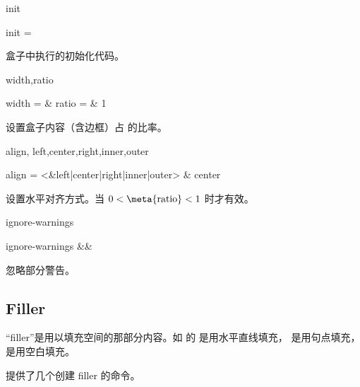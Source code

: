 \documentclass[twoside]{book}
\def\xampletext{\par}
\def\xampleprint{\xamplecode \xampleline \xampletext}
\begin{document}
\begin{keyval}[path=frame]{init}
  \begin{syntax}
    init = 
  \end{syntax}
盒子中执行的初始化代码。
\end{keyval}

\begin{keyval}[path=frame]{width,ratio}
  \begin{syntax}
    width =  & \V\textwidth
    ratio =  & 1
  \end{syntax}
 设置盒子内容（含边框）占  的比率。
\end{keyval}

\begin{keyval}[path=frame]{align,
  left,center,right,inner,outer}
  \begin{syntax}
    align = <&left|center|right|inner|outer> & center 
  \end{syntax}
设置水平对齐方式。当 $ 0 <{} \text{\meta{ratio}} {}< 1 $ 时才有效。
\end{keyval}

\begin{xample}
\begin{Framed}[ratio=.8,center,
  rule-width=2pt,
  frame={\setlength{\fboxsep}{\cusframesep}%
          \setlength{\fboxrule}{\cusframerule}%
          \fcolorbox{purple}{cyan!50}}]
\zhlipsum[9][name=zhufu]
\end{Framed}
\stopxamplecode
\xampleprint 
\vskip 1pt 
\end{xample}

\begin{keyval}[path=frame]{ignore-warnings}
  \begin{syntax}
    ignore-warnings &&
  \end{syntax}
忽略部分警告。
\end{keyval}


\subsection{Filler}

“filler”是用以填充空间的那部分内容。如 \LaTeXe 的  是用水平直线填充，
 是用句点填充， 是用空白填充。

 提供了几个创建 filler 的命令。
\end{document}
